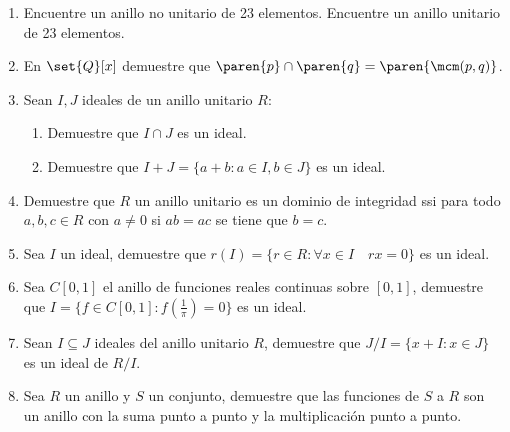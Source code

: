 \documentclass{ayudantia}
\begin{document}
\begin{enumerate}
    \item Encuentre un anillo no unitario de 23 elementos. Encuentre un anillo unitario de 23 elementos.
    \item En \(\set{Q}[x]\) demuestre que \(\paren{p}\cap\paren{q}=\paren{\mcm(p,q)}\).
    \item Sean \(I,J\) ideales de un anillo unitario \(R\):
    \begin{enumerate}
        \item Demuestre que \(I\cap J\) es un ideal.
        \item Demuestre que \(I+J=\{a+b:a\in I, b\in J\}\) es un ideal.
    \end{enumerate}
    \item Demuestre que \(R\) un anillo unitario es un dominio de integridad ssi para todo \(a,b,c\in R\) con \(a\neq0\) si \(ab=ac\) se tiene que \(b=c\).
    \item Sea \(I\) un ideal, demuestre que \(r(I)=\{r\in R:\forall x\in I\quad rx=0\}\) es un ideal.
    \item Sea \(C[0,1]\) el anillo de funciones reales continuas sobre \([0,1]\), demuestre que \(I=\{f\in C[0,1]:f(\frac1\pi)=0\}\) es un ideal.
    \item Sean \(I\subseteq J\) ideales del anillo unitario \(R\), demuestre que \(J/I=\{x+I:x\in J\}\) es un ideal de \(R/I\).
    \item Sea \(R\) un anillo y \(S\) un conjunto, demuestre que las funciones de \(S\) a \(R\) son un anillo con la suma punto a punto y la multiplicación punto a punto.
\end{enumerate}
\end{document}
